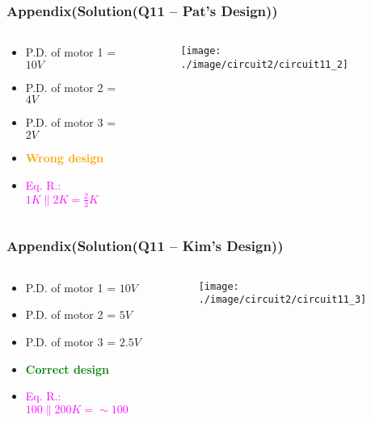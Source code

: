 \documentclass{beamer}
\newcommand{\green}[1]{\textcolor{green}{#1}}
\newcommand{\orange}[1]{\textcolor{orange}{#1}}
\newcommand{\magenta}[1]{\textcolor{magenta}{#1}}
\begin{document}
\begin{frame}
\frametitle{Appendix(Solution(Q11 -- Pat's Design))}
\begin{columns}
\begin{column}{5.5cm}
\begin{itemize} \itemsep1pt \parskip0pt 
  \item[] P.D. of motor 1 = $10V$
  \item[] P.D. of motor 2 = $4V$
  \item[] P.D. of motor 3 = $2V$
  \item[] \orange{\bf Wrong design}
\end{itemize}

\begin{itemize} \itemsep1pt \parskip0pt 
  \item[] \magenta{Eq. R.: $1K \parallel 2K = \frac{2}{3}K$}
\end{itemize}
\end{column}


\begin{column}{6.5cm}
\begin{figure}[H]
  \centering
  \texttt{[image: ./image/circuit2/circuit11\_2]}
\end{figure}
\end{column}
\end{columns}

\end{frame}


\begin{frame}
\frametitle{Appendix(Solution(Q11 -- Kim's Design))}
\begin{columns}
\begin{column}{5.5cm}
\begin{itemize} \itemsep1pt \parskip0pt 
  \item[] P.D. of motor 1 = $10V$
  \item[] P.D. of motor 2 = $5V$
  \item[] P.D. of motor 3 = $2.5V$
  \item[] \green{\bf Correct design}
\end{itemize}

\begin{itemize} \itemsep1pt \parskip0pt 
  \item[] \magenta{Eq. R.: $100 \parallel 200K = \sim 100$}
\end{itemize}
\end{column}


\begin{column}{6.5cm}
\begin{figure}[H]
  \centering
  \texttt{[image: ./image/circuit2/circuit11\_3]}
\end{figure}
\end{column}
\end{columns}

\end{frame}
\end{document}
